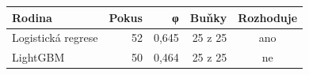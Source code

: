 \begin{tabular}{lrrrc}
\toprule
Rodina & Pokus & φ & Buňky & Rozhoduje\\
\midrule
Logistická regrese & 52 & 0,645 & 25 z 25 & ano\\
LightGBM & 50 & 0,464 & 25 z 25 & ne\\
\bottomrule
\end{tabular}
